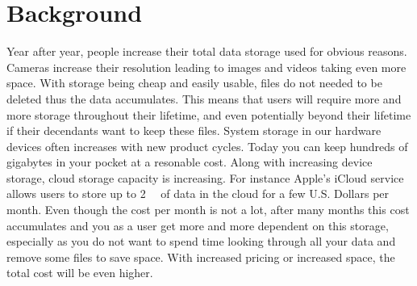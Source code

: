 \section{Background}
\label{sec:background}



Year after year, people increase their total data storage used for obvious reasons. Cameras increase their resolution leading to images and videos taking even more space. With storage being cheap and easily usable, files do not needed to be deleted thus the data accumulates. %
This means that users will require more and more storage throughout their lifetime, and even potentially beyond their lifetime if their decendants want to keep these files. System storage in our hardware devices often increases with new product cycles. Today you can keep hundreds of gigabytes in your pocket at a resonable cost. %
Along with increasing device storage, cloud storage capacity is increasing. For instance Apple's iCloud service allows users to store up to \SI{2}{\tera\byte} of data in the cloud for a few U.S. Dollars per month. %
Even though the cost per month is not a lot, after many months this cost accumulates and you as a user get more and more dependent on this storage, especially as you do not want to spend time looking through all your data and remove some files to save space. %
With increased pricing or increased space, the total cost will be even higher.

